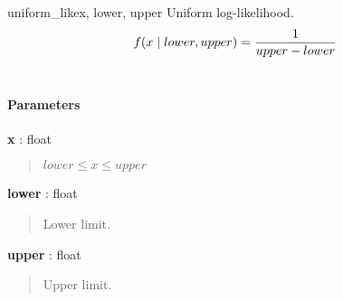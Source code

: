 \hypertarget{pymc.distributions.uniform_like}{}
\begin{funcdesc}{uniform\_like}{x, lower, upper}
Uniform log-likelihood.
\begin{gather}
\begin{split}f(x \mid lower, upper) = \frac{1}{upper-lower}\end{split}\notag\\\begin{split}\end{split}\notag
\end{gather}\paragraph{Parameters}\begin{paramlist}

\item[] \textbf{x} : float
\begin{quote}

$lower \leq x \leq upper$
\end{quote}

\item[] \textbf{lower} : float
\begin{quote}

Lower limit.
\end{quote}

\item[] \textbf{upper} : float
\begin{quote}

Upper limit.
\end{quote}
\end{paramlist}
\end{funcdesc}


